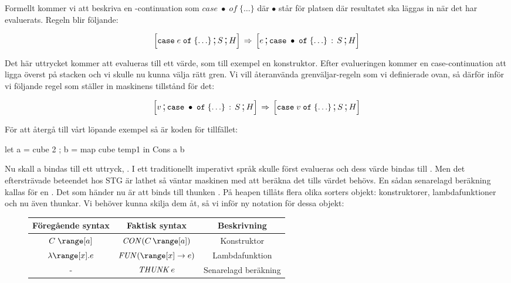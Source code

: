 \documentclass[../Core]{subfiles}
\begin{document}
Formellt kommer vi att beskriva en -continuation som $case\;\bullet\; of\;\{\ldots\}$
där $\bullet$ står för platsen där resultatet ska läggas in när det har evaluerats. Regeln
blir följande:

\[
\text{\large$$}\Big[\mathtt{case}\; e\; \mathtt{of}\;\{\ldots\} \,\text{\Large;}\, S \,\text{\Large;}\, H\Big] \,\Rightarrow\, \text{\large$$}\Big[e \,\text{\Large;}\, \mathtt{case}\;\bullet\; \mathtt{of}\;\{\ldots\} \,:\, S \,\text{\Large;}\,  H\Big]
\]


Det här uttrycket kommer att evalueras till ett värde, som till exempel en konstruktor.
Efter evalueringen kommer en case-continuation att ligga överst på stacken och vi skulle nu kunna välja
rätt gren. Vi vill återanvända grenväljar-regeln som vi definierade
ovan, så därför inför vi följande regel som ställer in maskinens tillstånd för det:

\[
\text{\large$$}\Big[v \,\text{\Large;}\, \mathtt{case}\;\bullet\; \mathtt{of}\;\{\ldots\} \,:\, S \,\text{\Large;}\, H\Big]\,\Rightarrow\, \text{\large$$}\Big[\mathtt{case}\; v\; \mathtt{of}\;\{\ldots\} \,\text{\Large;}\, S \,\text{\Large;}\, H\Big]
\]


För att återgå till vårt löpande exempel så är koden för tillfället:

\begin{codeEx}
let { a = cube 2
    ; b = map cube temp1
    } in Cons a b
\end{codeEx}

Nu skall a bindas till ett uttryck, . I ett traditionellt imperativt språk skulle
 först evalueras och dess värde bindas till . 
Men det eftersträvade beteendet hos STG är lathet
så väntar maskinen med att beräkna det tills värdet behövs.
En sådan senarelagd beräkning kallas för en . Det som händer nu är att
 binds till thunken . På heapen tillåts flera olika
sorters objekt: konstruktorer, lambdafunktioner och nu även thunkar.
Vi behöver kunna skilja dem åt, så vi inför ny notation för dessa objekt: \\[0.3cm]
\begin{figure}[H]
  \begin{center}
    \begin{tabular}{ccc}
    Föregående syntax & Faktisk syntax & Beskrivning\tabularnewline
    \hline
    $C\;\range[a]$ & $\CON C{\range[a]}$ & Konstruktor\tabularnewline
    $\lambda\range[x].e$ & $\FUN{\range[x]}e$ & Lambdafunktion\tabularnewline
    - & $\text{\emph{THUNK}}\,e$ & Senarelagd beräkning\tabularnewline
    \end{tabular} 
  \end{center} 
\end{figure}%
\end{document}
